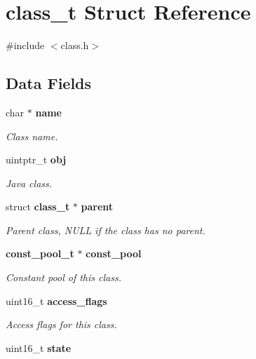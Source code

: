 \section{class\_\-t Struct Reference}
\label{structclass__t}


{\ttfamily \#include $<$class.h$>$}

\subsection*{Data Fields}
\begin{DoxyCompactItemize}
\item 
char $\ast$ {\bf name}\label{structclass__t_a6350eec8755ca11f99fdf2240e39a84f}

\begin{DoxyCompactList}\small\item\em Class name. \item\end{DoxyCompactList}\item 
uintptr\_\-t {\bf obj}\label{structclass__t_ad54a0b542edb1d642106c60ff03acea0}

\begin{DoxyCompactList}\small\item\em Java class. \item\end{DoxyCompactList}\item 
struct {\bf class\_\-t} $\ast$ {\bf parent}\label{structclass__t_a623466da66b2b18d9f6d5d96c382ffb7}

\begin{DoxyCompactList}\small\item\em Parent class, NULL if the class has no parent. \item\end{DoxyCompactList}\item 
{\bf const\_\-pool\_\-t} $\ast$ {\bf const\_\-pool}\label{structclass__t_ad9829606f2d672045605cc1e4007caa4}

\begin{DoxyCompactList}\small\item\em Constant pool of this class. \item\end{DoxyCompactList}\item 
uint16\_\-t {\bf access\_\-flags}\label{structclass__t_abc7575fb3263f2a0e033120b14da830b}

\begin{DoxyCompactList}\small\item\em Access flags for this class. \item\end{DoxyCompactList}\item 
uint16\_\-t {\bf state}\label{structclass__t_a6fe119d35c3df63dd96acd8707aed53d}


\end{DoxyCompactItemize}
